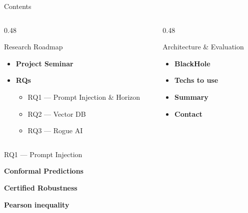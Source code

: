 \documentclass[aspectratio=169, 11pt]{beamer}
\begin{document}
\begin{frame}{Contents}
    \begin{columns}[t, onlytextwidth]
        \begin{column}{0.48\textwidth}
            \begin{icard}[AccentBlue]{Research Roadmap}
                \begin{itemize}
                    \setlength\itemsep{0.35em}
                    \item \textbf{Project Seminar}
                    \item \textbf{RQs}
                    \begin{itemize}
                        \setlength\itemsep{0.2em}
                        \item RQ1 --- Prompt Injection \& Horizon
                        \item RQ2 --- Vector DB
                        \item RQ3 --- Rogue AI
                    \end{itemize}
                \end{itemize}
            \end{icard}
        \end{column}
        \begin{column}{0.48\textwidth}
            \begin{icard}[AccentIndigo]{Architecture \& Evaluation}
                \begin{itemize}
                    \setlength\itemsep{0.35em}
                    \item \textbf{BlackHole}
                    \item \textbf{Techs to use}
                    \item \textbf{Summary}
                    \item \textbf{Contact}
                \end{itemize}
            \end{icard}
        \end{column}
    \end{columns}
\end{frame}

\begin{frame}{RQ1 --- Prompt Injection}
    \begin{plaincard}[AccentBlue]
        \textbf{Conformal Predictions}
    \end{plaincard}
    \vspace{0.2cm}
    \begin{plaincard}[AccentIndigo]
        \textbf{Certified Robustness}
    \end{plaincard}
    \vspace{0.2cm}
    \begin{plaincard}[AccentTeal]
        \textbf{Pearson inequality}
    \end{plaincard}
\end{frame}
\end{document}
